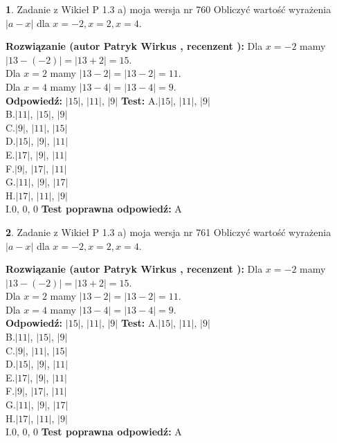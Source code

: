 \documentclass[12pt, a4paper]{article}
\theoremstyle{definition} %
\newtheorem{zad}{}
\newcommand{\zadStart}[1]{\begin{zad}#1\newline}
\newcommand{\zadStop}{\end{zad}}
\newcommand{\rozwStart}[2]{\noindent \textbf{Rozwiązanie (autor #1 , recenzent #2): }\newline}
\newcommand{\rozwStop}{\newline}
\newcommand{\odpStart}{\noindent \textbf{Odpowiedź:}\newline}
\newcommand{\odpStop}{\newline}
\newcommand{\testStart}{\noindent \textbf{Test:}\newline}
\newcommand{\testStop}{\newline}
\newcommand{\kluczStart}{\noindent \textbf{Test poprawna odpowiedź:}\newline}
\newcommand{\kluczStop}{\newline}
\begin{document}
\zadStart{Zadanie z Wikieł P 1.3 a) moja wersja nr 760}
Obliczyć wartość wyrażenia $|a - x|$ dla $x=-2,x=2,x=4$.
\zadStop
\rozwStart{Patryk Wirkus}{}
Dla $x = -2$ mamy $|13 - (-2)| = |13 + 2| = 15$.\\
Dla $x = 2$ mamy $|13 - 2| = |13 - 2| = 11$.\\
Dla $x = 4$ mamy $|13 - 4| = |13 - 4| = 9$.\\
\rozwStop
\odpStart
$|15|$, $|11|$, $|9|$
\odpStop
\testStart
A.$|15|$, $|11|$, $|9|$\\
B.$|11|$, $|15|$, $|9|$\\
C.$|9|$, $|11|$, $|15|$\\
D.$|15|$, $|9|$, $|11|$\\
E.$|17|$, $|9|$, $|11|$\\
F.$|9|$, $|17|$, $|11|$\\
G.$|11|$, $|9|$, $|17|$\\
H.$|17|$, $|11|$, $|9|$\\
I.$0$, $0$, $0$
\testStop
\kluczStart
A
\kluczStop



\zadStart{Zadanie z Wikieł P 1.3 a) moja wersja nr 761}
Obliczyć wartość wyrażenia $|a - x|$ dla $x=-2,x=2,x=4$.
\zadStop
\rozwStart{Patryk Wirkus}{}
Dla $x = -2$ mamy $|13 - (-2)| = |13 + 2| = 15$.\\
Dla $x = 2$ mamy $|13 - 2| = |13 - 2| = 11$.\\
Dla $x = 4$ mamy $|13 - 4| = |13 - 4| = 9$.\\
\rozwStop
\odpStart
$|15|$, $|11|$, $|9|$
\odpStop
\testStart
A.$|15|$, $|11|$, $|9|$\\
B.$|11|$, $|15|$, $|9|$\\
C.$|9|$, $|11|$, $|15|$\\
D.$|15|$, $|9|$, $|11|$\\
E.$|17|$, $|9|$, $|11|$\\
F.$|9|$, $|17|$, $|11|$\\
G.$|11|$, $|9|$, $|17|$\\
H.$|17|$, $|11|$, $|9|$\\
I.$0$, $0$, $0$
\testStop
\kluczStart
A
\kluczStop
\end{document}
